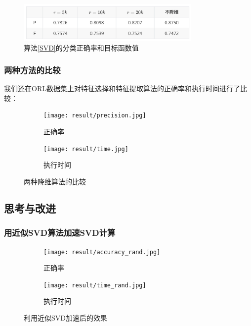 \documentclass{ctexart}
\begin{document}
    \begin{figure}
        \centering
        \includegraphics[width=0.8\textwidth]{result/nipsp.png}
        \caption{算法\autoref{SVD}的分类正确率和目标函数值}
        \label{fig:nipsp}
    \end{figure}

    \subsubsection{两种方法的比较}
        我们还在ORL数据集上对特征选择和特征提取算法的正确率和执行时间进行了比较：
        \begin{figure}
            \centering
            \begin{subfigure}{.5\textwidth}
                \centering
                \texttt{[image: result/precision.jpg]}
                \caption{正确率}
            \end{subfigure}%
            \begin{subfigure}{.5\textwidth}
                \centering
                \texttt{[image: result/time.jpg]}
                \caption{执行时间}
            \end{subfigure}
            \caption{两种降维算法的比较}
            \label{fig:cmp}
        \end{figure}
    \subsection{思考与改进}

    \subsubsection{用近似SVD算法加速SVD计算}
        \begin{figure}
            \centering
            \begin{subfigure}{.5\textwidth}
                \centering
                \texttt{[image: result/accuracy\_rand.jpg]}
                \caption{正确率}
            \end{subfigure}%
            \begin{subfigure}{.5\textwidth}
                \centering
                \texttt{[image: result/time\_rand.jpg]}
                \caption{执行时间}
            \end{subfigure}
            \caption{利用近似SVD加速后的效果}
            \label{fig:3cmp}
        \end{figure}
\end{document}
